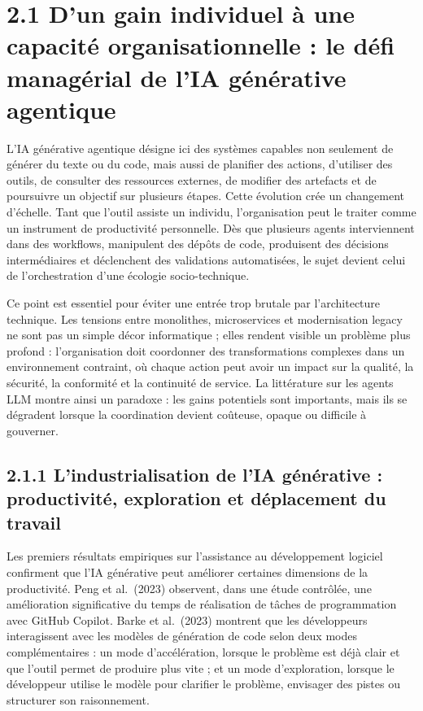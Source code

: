 \section{2.1 D'un gain individuel à une capacité organisationnelle : le défi managérial de l'IA générative agentique}\label{dun-gain-individuel-uxe0-une-capacituxe9-organisationnelle-le-duxe9fi-managuxe9rial-de-lia-guxe9nuxe9rative-agentique}

L'IA générative agentique désigne ici des systèmes capables non seulement de générer du texte ou du code, mais aussi de planifier des actions, d'utiliser des outils, de consulter des ressources externes, de modifier des artefacts et de poursuivre un objectif sur plusieurs étapes. Cette évolution crée un changement d'échelle. Tant que l'outil assiste un individu, l'organisation peut le traiter comme un instrument de productivité personnelle. Dès que plusieurs agents interviennent dans des workflows, manipulent des dépôts de code, produisent des décisions intermédiaires et déclenchent des validations automatisées, le sujet devient celui de l'orchestration d'une écologie socio-technique.

Ce point est essentiel pour éviter une entrée trop brutale par l'architecture technique. Les tensions entre monolithes, microservices et modernisation legacy ne sont pas un simple décor informatique ; elles rendent visible un problème plus profond : l'organisation doit coordonner des transformations complexes dans un environnement contraint, où chaque action peut avoir un impact sur la qualité, la sécurité, la conformité et la continuité de service. La littérature sur les agents LLM montre ainsi un paradoxe : les gains potentiels sont importants, mais ils se dégradent lorsque la coordination devient coûteuse, opaque ou difficile à gouverner.

\subsection{2.1.1 L'industrialisation de l'IA générative : productivité, exploration et déplacement du travail}\label{lindustrialisation-de-lia-guxe9nuxe9rative-productivituxe9-exploration-et-duxe9placement-du-travail}

Les premiers résultats empiriques sur l'assistance au développement logiciel confirment que l'IA générative peut améliorer certaines dimensions de la productivité. Peng et al.~(2023) observent, dans une étude contrôlée, une amélioration significative du temps de réalisation de tâches de programmation avec GitHub Copilot. Barke et al.~(2023) montrent que les développeurs interagissent avec les modèles de génération de code selon deux modes complémentaires : un mode d'accélération, lorsque le problème est déjà clair et que l'outil permet de produire plus vite ; et un mode d'exploration, lorsque le développeur utilise le modèle pour clarifier le problème, envisager des pistes ou structurer son raisonnement.

